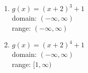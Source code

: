 \documentclass{ximera}
\begin{document}
\begin{multicols}{2}
\begin{enumerate}
\setcounter{enumi}{\value{HW}}

\item $g(x) = (x + 2)^{3} + 1$ \\ 
domain: $(-\infty, \infty)$ \\ 
range: $(-\infty, \infty)$ \\


\vfill

\columnbreak

\item $g(x) = (x + 2)^{4} + 1$\\
domain: $(-\infty, \infty)$\\
range: $[1, \infty)$\\


\setcounter{HW}{\value{enumi}}
\end{enumerate}
\end{multicols}
\end{document}
